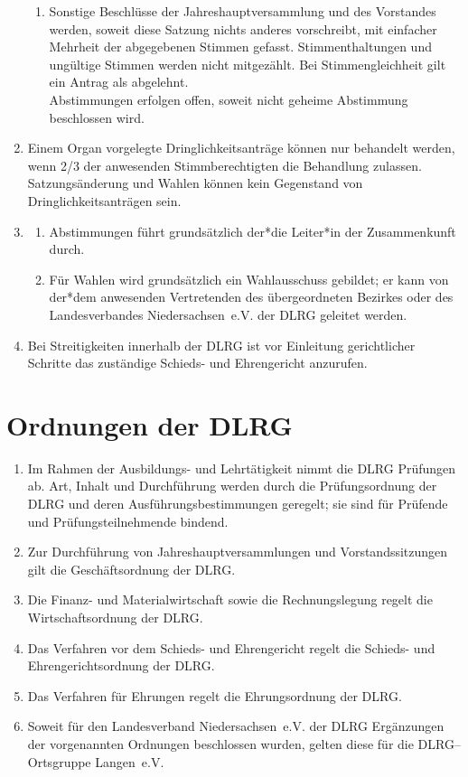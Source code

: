 \documentclass[%
12pt, %
a4paper, %
headsepline, %
parskip, %
headings=normal, %
]{scrreprt}
\begin{document}
\begin{enumerate}
\begin{enumerate}[noitemsep]
        \item Sonstige Beschlüsse der Jahreshauptversammlung und des Vorstandes werden, soweit diese Satzung nichts anderes vorschreibt, mit einfacher Mehrheit der abgegebenen Stimmen gefasst. Stimmenthaltungen und ungültige Stimmen werden nicht mitgezählt. Bei Stimmengleichheit gilt ein Antrag als abgelehnt.\\
          Abstimmungen erfolgen offen, soweit nicht geheime Abstimmung beschlossen wird.
      \end{enumerate}
    \item Einem Organ vorgelegte Dringlichkeitsanträge können nur behandelt werden, wenn \num{2/3} der anwesenden Stimmberechtigten die Behandlung zulassen. Satzungsänderung und Wahlen können kein Gegenstand von Dringlichkeitsanträgen sein.
    \item \begin{enumerate}[noitemsep]
        \item Abstimmungen führt grundsätzlich der*die Leiter*in der Zusammenkunft durch.
        \item Für Wahlen wird grundsätzlich ein Wahlausschuss gebildet; er kann von der*dem anwesenden Vertretenden des übergeordneten Bezirkes oder des Landesverbandes Niedersachsen~e.V. der DLRG geleitet werden.
      \end{enumerate}
    \item Bei Streitigkeiten innerhalb der DLRG ist vor Einleitung gerichtlicher Schritte das zuständige Schieds- und Ehrengericht anzurufen.
\end{enumerate}

\section{Ordnungen der DLRG}
\label{sec:ordnungen}
\begin{enumerate}
    \item Im Rahmen der Ausbildungs- und Lehrtätigkeit nimmt die DLRG Prüfungen ab. Art, Inhalt und Durchführung werden durch die Prüfungsordnung der DLRG und deren Ausführungsbestimmungen geregelt; sie sind für Prüfende und Prüfungsteilnehmende bindend.
    \item Zur Durchführung von Jahreshauptversammlungen und Vorstandssitzungen gilt die Geschäftsordnung der DLRG.
    \item Die Finanz- und Materialwirtschaft sowie die Rechnungslegung regelt die Wirtschaftsordnung der DLRG.
    \item Das Verfahren vor dem Schieds- und Ehrengericht regelt die Schieds- und Ehrengerichtsordnung der DLRG.
    \item Das Verfahren für Ehrungen regelt die Ehrungsordnung der DLRG.
    \item Soweit für den Landesverband Niedersachsen~e.V. der DLRG Ergänzungen der vorgenannten Ordnungen beschlossen wurden, gelten diese für die DLRG--Ortsgruppe Langen~e.V.
\end{enumerate}
\end{document}
